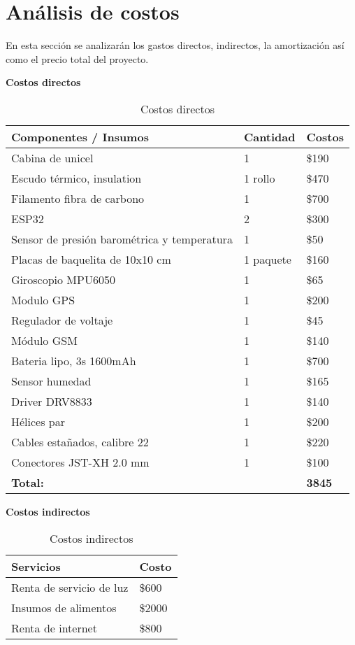 \newpage
\section{Análisis de costos} 
En esta sección se analizarán los gastos directos, indirectos, la amortización así como el precio total del proyecto.

\textbf{Costos directos}

\begin{table}[H]
\centering
\caption{Costos directos}
\begin{tabular}{p{4cm}|p{4cm}|p{4cm}}
\hline
\textbf{Componentes / Insumos }& \textbf{Cantidad} & \textbf{Costos} \\
\hline
Cabina de unicel&1&\$190\\
\hline
Escudo térmico, insulation&1 rollo&\$470\\
\hline
Filamento fibra de carbono&1&\$700\\
\hline
ESP32&2&\$300\\
\hline
Sensor de presión barométrica y temperatura&1&\$50\\
\hline
Placas de baquelita de 10x10 cm&1 paquete&\$160\\
\hline
Giroscopio MPU6050&1&\$65\\
\hline
Modulo GPS&1&\$200\\
\hline
Regulador de voltaje&1&\$45\\
\hline
Módulo GSM&1&\$140\\
\hline
Bateria lipo, 3s 1600mAh&1&\$700\\
\hline
Sensor humedad&1&\$165\\
\hline
Driver DRV8833&1&\$140\\
\hline
Hélices par&1&\$200\\
\hline
Cables estañados, calibre 22&1&\$220\\
\hline
Conectores JST-XH 2.0 mm&1&\$100\\
\hline
\textbf{Total:} & &\textbf{3845}\\

\hline
\end{tabular}
\label{tabla:costosDirectos}
\end{table}


\textbf{Costos indirectos}

\begin{table}[H]
\centering
\caption{Costos indirectos}
\begin{tabular}{p{6cm}|p{4cm}}
\hline
\textbf{Servicios } & \textbf{Costo} \\
\hline
Renta de servicio de luz &\$600\\
\hline
Insumos de alimentos&\$2000\\
\hline
Renta de internet&\$800\\

\hline
\end{tabular}
\label{tabla:costosIndirectos}
\end{table}


